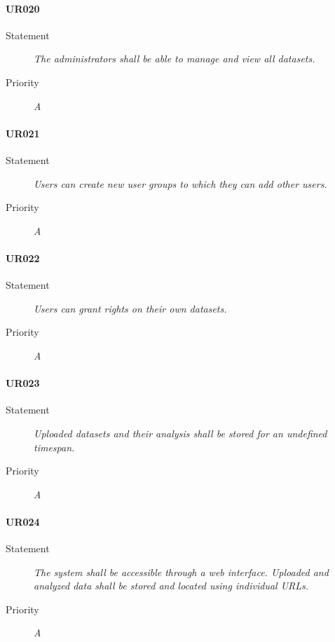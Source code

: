 \paragraph{UR020}
\begin{description}
    \item[Statement]
        \textit{The administrators shall be able to manage and view all datasets.}
    \item [Priority] \textit{A}
\end{description}

\paragraph{UR021}
\begin{description}
    \item[Statement]
        \textit{Users can create new user groups to which they can add other users.}
    \item [Priority] \textit{A}
\end{description}

\paragraph{UR022}
\begin{description}
    \item[Statement]
        \textit{Users can grant rights on their own datasets.}
    \item [Priority] \textit{A}
\end{description}

\paragraph{UR023}
\begin{description}
    \item[Statement]
        \textit{Uploaded datasets and their analysis shall be stored for an undefined timespan.}
    \item [Priority] \textit{A}
\end{description}

\paragraph{UR024}
\begin{description}
    \item[Statement]
        \textit{The system shall be accessible through a web interface. Uploaded and analyzed data shall be stored and located using individual URLs.}
    \item [Priority] \textit{A}
\end{description}






